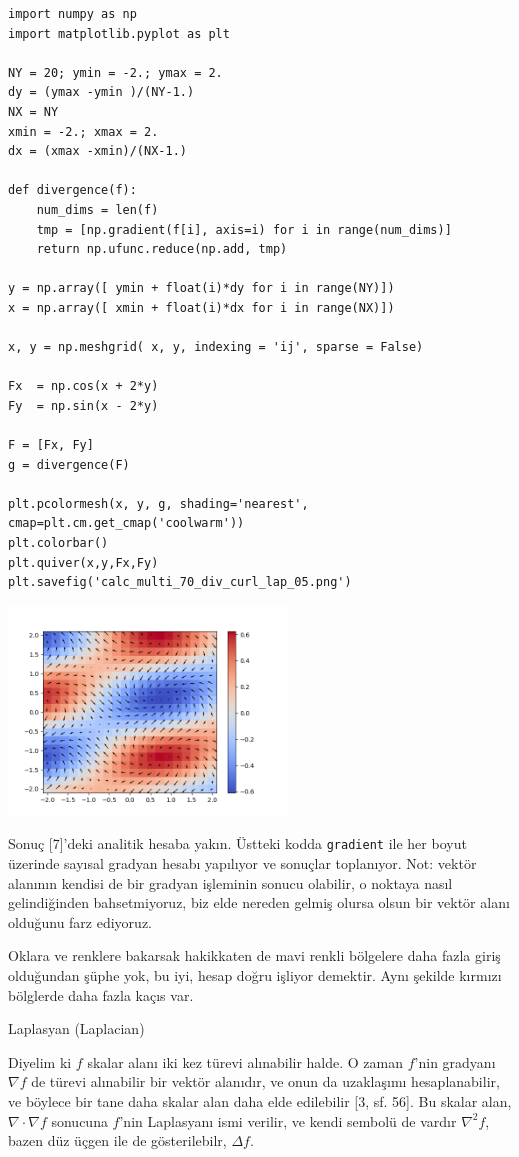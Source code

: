 \documentclass[12pt,fleqn]{article}\usepackage{../../common}
\begin{document}
\begin{verbatim}
import numpy as np
import matplotlib.pyplot as plt

NY = 20; ymin = -2.; ymax = 2.
dy = (ymax -ymin )/(NY-1.)
NX = NY
xmin = -2.; xmax = 2.
dx = (xmax -xmin)/(NX-1.)

def divergence(f):
    num_dims = len(f)
    tmp = [np.gradient(f[i], axis=i) for i in range(num_dims)]
    return np.ufunc.reduce(np.add, tmp)

y = np.array([ ymin + float(i)*dy for i in range(NY)])
x = np.array([ xmin + float(i)*dx for i in range(NX)])

x, y = np.meshgrid( x, y, indexing = 'ij', sparse = False)

Fx  = np.cos(x + 2*y)
Fy  = np.sin(x - 2*y)

F = [Fx, Fy]
g = divergence(F)

plt.pcolormesh(x, y, g, shading='nearest', cmap=plt.cm.get_cmap('coolwarm'))
plt.colorbar()
plt.quiver(x,y,Fx,Fy)
plt.savefig('calc_multi_70_div_curl_lap_05.png')
\end{verbatim}

\includegraphics[width=20em]{calc_multi_70_div_curl_lap_05.png}

Sonuç [7]'deki analitik hesaba yakın. Üstteki kodda \verb!gradient! ile her
boyut üzerinde sayısal gradyan hesabı yapılıyor ve sonuçlar toplanıyor. Not:
vektör alanının kendisi de bir gradyan işleminin sonucu olabilir, o noktaya
nasıl gelindiğinden bahsetmiyoruz, biz elde nereden gelmiş olursa olsun bir
vektör alanı olduğunu farz ediyoruz.

Oklara ve renklere bakarsak hakikkaten de mavi renkli bölgelere daha fazla giriş
olduğundan şüphe yok, bu iyi, hesap doğru işliyor demektir. Aynı şekilde kırmızı
bölglerde daha fazla kaçıs var.

Laplasyan (Laplacian)

Diyelim ki $f$ skalar alanı iki kez türevi alınabilir halde. O zaman $f$'nin
gradyanı $\nabla f$ de türevi alınabilir bir vektör alanıdır, ve onun da
uzaklaşımı hesaplanabilir, ve böylece bir tane daha skalar alan daha elde
edilebilir [3, sf. 56]. Bu skalar alan, $\nabla \cdot \nabla f$ sonucuna $f$'nin
Laplasyanı ismi verilir, ve kendi sembolü de vardır $\nabla^2 f$, bazen
düz üçgen ile de gösterilebilr, $\Delta f$.
\end{document}
